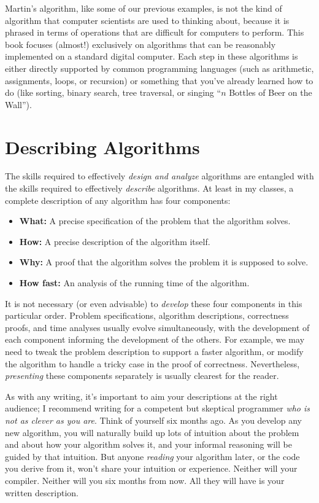 Martin’s algorithm, like some of our previous examples, is not the kind of algorithm that computer scientists are used to thinking about, because it is phrased in terms of operations that are difficult for computers to perform. This book focuses (almost!) exclusively on algorithms that can be reasonably implemented on a standard digital computer. Each step in these algorithms is either directly supported by common programming languages (such as arithmetic, assignments, loops, or recursion) or something that you’ve already learned how to do (like sorting, binary search, tree traversal, or singing “$n$ Bottles of Beer on the Wall”).

\section{Describing Algorithms}
\label{sec:0.5}

The skills required to effectively \textit{design and analyze} algorithms are entangled with the skills required to effectively \textit{describe} algorithms. At least in my classes, a complete description of any algorithm has four components:
\begin{itemize}
\item \textbf{What:} A precise specification of the problem that the algorithm solves.
\item \textbf{How:} A precise description of the algorithm itself.
\item \textbf{Why:} A proof that the algorithm solves the problem it is supposed to solve.
\item \textbf{How fast:} An analysis of the running time of the algorithm.
\end{itemize}
It is not necessary (or even advisable) to \textit{develop} these four components in this particular order. Problem specifications, algorithm descriptions, correctness proofs, and time analyses usually evolve simultaneously, with the development of each component informing the development of the others. For example, we may need to tweak the problem description to support a faster algorithm, or modify the algorithm to handle a tricky case in the proof of correctness. Nevertheless, \textit{presenting} these components separately is usually clearest for the reader.

As with any writing, it’s important to aim your descriptions at the right audience; I recommend writing for a competent but skeptical programmer \textit{who is not as clever as you are}. Think of yourself six months ago. As you develop any new algorithm, you will naturally build up lots of intuition about the problem and about how your algorithm solves it, and your informal reasoning will be guided by that intuition. But anyone \textit{reading} your algorithm later, or the code you derive from it, won’t share your intuition or experience. Neither will your compiler. Neither will you six months from now. All they will have is your written description.

